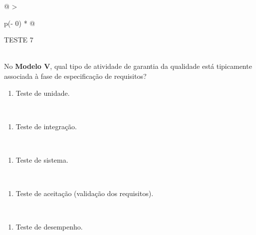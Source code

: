 \documentclass[
]{book}
\providecommand{\tightlist}{%
  \setlength{\itemsep}{0pt}\setlength{\parskip}{0pt}}
\begin{document}
\begin{longtable}[]{@{}
  >{\raggedright\arraybackslash}p{(\columnwidth - 0\tabcolsep) * }@{}}
\toprule\noalign{}
\begin{minipage}[b]{\linewidth}\raggedright
TESTE 7
\end{minipage} \\
\midrule\noalign{}
\endhead
\bottomrule\noalign{}
\endlastfoot
No \textbf{Modelo V}, qual tipo de atividade de garantia da qualidade está tipicamente associada à fase de especificação de requisitos? \\
\begin{minipage}[t]{\linewidth}\raggedright
\begin{enumerate}
\def\labelenumi{\Alph{enumi})}
\tightlist
\item
  Teste de unidade.
\end{enumerate}
\end{minipage} \\
\begin{minipage}[t]{\linewidth}\raggedright
\begin{enumerate}
\def\labelenumi{\Alph{enumi})}
\setcounter{enumi}{1}
\tightlist
\item
  Teste de integração.
\end{enumerate}
\end{minipage} \\
\begin{minipage}[t]{\linewidth}\raggedright
\begin{enumerate}
\def\labelenumi{\Alph{enumi})}
\setcounter{enumi}{2}
\tightlist
\item
  Teste de sistema.
\end{enumerate}
\end{minipage} \\
\begin{minipage}[t]{\linewidth}\raggedright
\begin{enumerate}
\def\labelenumi{\Alph{enumi})}
\setcounter{enumi}{3}
\tightlist
\item
  Teste de aceitação (validação dos requisitos).
\end{enumerate}
\end{minipage} \\
\begin{minipage}[t]{\linewidth}\raggedright
\begin{enumerate}
\def\labelenumi{\Alph{enumi})}
\setcounter{enumi}{4}
\tightlist
\item
  Teste de desempenho.
\end{enumerate}
\end{minipage} \\
\end{longtable}
\end{document}
